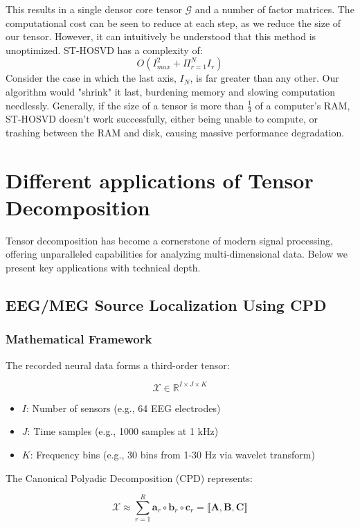 \documentclass[11pt]{article}
\newcommand\0{\mathbf{0}}
\newcommand\<{\langle}
\renewcommand\>{\rangle}
\begin{document}
This results in a single densor core tensor $\mathcal{G}$ and a number of factor matrices. The computational cost can be seen to reduce at each step, as we reduce the size of our tensor. However, it can intuitively be understood that this method is unoptimized. ST-HOSVD has a complexity of: $$O(I^2_{max}+\Pi_{r=1}^{N} I_r)$$ Consider the case in which the last axis, $I_N$, is far greater than any other. Our algorithm would "shrink" it last, burdening memory and slowing computation needlessly. Generally, if the size of a tensor is more than $\frac{1}{3}$ of a computer's RAM, ST-HOSVD doesn't work successfully, either being unable to compute, or trashing between the RAM and disk, causing massive performance degradation.

\section{Different applications of Tensor Decomposition}
Tensor decomposition has become a cornerstone of modern signal processing, offering unparalleled capabilities for analyzing multi-dimensional data. Below we present key applications with technical depth.

    \subsection{EEG/MEG Source Localization Using CPD}
    \subsubsection{Mathematical Framework}
    The recorded neural data forms a third-order tensor:
    
    \begin{equation}
    \mathcal{X} \in \mathbb{R}^{I \times J \times K}
    \end{equation}
    
    \begin{itemize}
        \item \(I\): Number of sensors (e.g., 64 EEG electrodes)
        \item \(J\): Time samples (e.g., 1000 samples at 1 kHz)
        \item \(K\): Frequency bins (e.g., 30 bins from 1-30 Hz via wavelet transform)
    \end{itemize}
    
    The Canonical Polyadic Decomposition (CPD) represents:
    
    \begin{equation}
    \mathcal{X} \approx \sum_{r=1}^R \mathbf{a}_r \circ \mathbf{b}_r \circ \mathbf{c}_r = \llbracket \mathbf{A}, \mathbf{B}, \mathbf{C} \rrbracket
    \end{equation}
    
\end{document}
